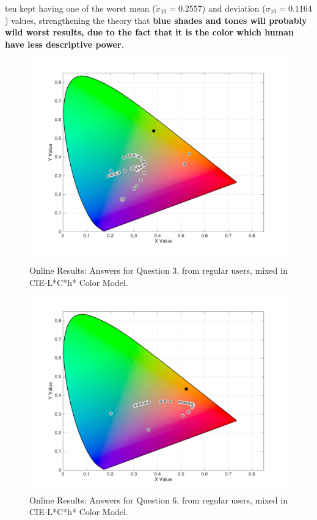 ten kept having one of the worst mean ($\tilde{x}_{10} = 0.2557$) and deviation ($\sigma_{10} = 0.1164$) values, strengthening the theory that \textbf{blue shades and tones will probably wild worst results, due to the fact
that it is the color which human have less descriptive power}. \par
%
\begin{figure}[!htbp]
  \centering
  \begin{minipage}{0.48\textwidth}
    \centering
    \includegraphics[width=\textwidth]{images/results/3_online_LChresponses.png}
    \caption[Online Results: Answers for Question 3, from regular users, mixed in CIE-L*C*h* Color Model.]{Online Results: Answers for Question 3, from regular users, mixed in CIE-L*C*h* Color Model.}
    \label{fig:onlinelchregular_3}
  \end{minipage}\hfill
  \begin{minipage}{0.48\textwidth}
    \centering
    \includegraphics[width=\textwidth]{images/results/6_online_LChresponses.png}
    \caption[Online Results: Answers for Question 6, from regular users, mixed in CIE-L*C*h* Color Model.]{Online Results: Answers for Question 6, from regular users, mixed in CIE-L*C*h* Color Model.}
    \label{fig:onlinelchregular_6}
  \end{minipage}
\end{figure}
